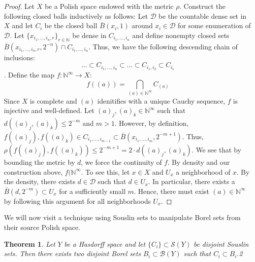\documentclass[12pt]{article}
\newtheorem{theorem}{Theorem}[section]
\theoremstyle{remark}
\begin{document}
\begin{proof}
Let $X$ be a Polish space endowed with the metric $\rho$. Construct the following closed balls inductively as follows:
Let $\mathcal{D}$ be the countable dense set in $X$ and let $C_i$ be the closed ball $\bar{B}(x_i,1)$ around $x_i \in \mathcal{D}$ for some enumeration of $\mathcal{D}$. Let $\{x_{i_1,...,i_n,r}\}_{r \in \mathbb{N}}$ be dense in $C_{i_1,...,i_n}$ and define nonempty closed sets $\bar{B}(x_{i_1,...,i_n,r},2^{-n}) \cap C_{i_1,...,i_n}$. Thus, we have the following descending chain of inclusions: $$ ... \subset C_{i_1,...,i_n} \subset ... \subset C_{i_1,i_2}\subset C_{i_1}$$.
Define the map $f:\mathbb{N}^{\infty} \rightarrow X$:
$$f((a)) = \bigcap_{(a) \in \mathbb{N}^{\infty}} C_{(a)} $$
Since $X$ is complete and $(a)$ idenitifies with a unique Cauchy sequence, $f$ is injective and well-defined. Let $(a)_j,(a)_k \in \mathbb{N}^{\infty}$ such that $d((a)_j,(a)_k) \leq 2^{-m}$ and $m > 1$. However, by definition, $f((a)_j),f((a)_k) \in C_{i_1,...,i_{m-1}} \subset \bar{B}(x_{i_1,...,i_{m}},2^{-m+1})$. Thus, $\rho(f((a)_j),f((a)_k)) \leq 2^{-m+1} = 2 \cdot d((a)_j,(a)_k)$. We see that by bounding the metric by $d$, we force the continuity of $f$. By density and our construction above, $f(\mathbb{N}^{\infty}$. To see this, let $x \in X$ and $U_x$ a neighborhood of $x$. By the density, there exists $d \in \mathcal{D}$ such that $d \in U_x$. In particular, there exists a $\bar{B}(d,2^{-m}) \subset U_x$ for a sufficiently small $m$. Hence, there must exist $(a) \in \mathbb{N}^{\infty}$ by following this argument for all neighborhoods $U_x$.
\end{proof}

We will now visit a technique using Souslin sets to manipulate Borel sets from their source Polish space. 

\begin{theorem}
Let $Y$ be a Hasdorff space and let $\{C_i\} \subset \mathcal{S}(Y)$ be disjoint Souslin sets. Then there exists two disjoint Borel sets $B_i \subset \mathcal{B}(Y)$ such that $C_i \subset B_i$.2  
\end{theorem}
\end{document}
